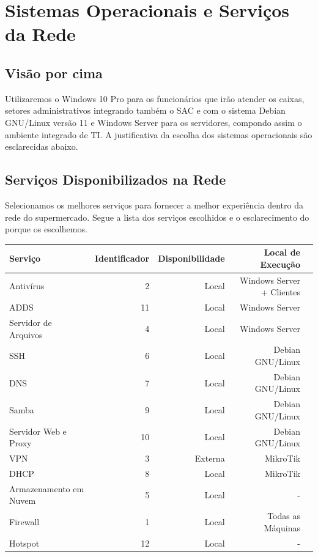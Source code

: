 \documentclass[12pt]{article}
\begin{document}
\section{Sistemas Operacionais e Serviços da Rede}

\subsection{Visão por cima}
Utilizaremos o Windows 10 Pro para os funcionários que irão atender os caixas, setores administrativos integrando também o SAC e com o sistema Debian GNU/Linux versão 11 e Windows Server para os servidores, compondo assim o ambiente integrado de TI. A justificativa da escolha dos sistemas operacionais são esclarecidas abaixo.

\subsection{Serviços Disponibilizados na Rede}
Selecionamos os melhores serviços para fornecer a melhor experiência dentro da rede do supermercado. Segue a lista dos serviços escolhidos e o esclarecimento do porque os escolhemos.

\begin{center}
\begin{tabular}{| l | r | r | r | r |}
\hline
Serviço & Identificador & Disponibilidade & Local de Execução\\
\hline
Antivírus & 2 & Local & Windows Server + Clientes\\
ADDS & 11 & Local & Windows Server\\
Servidor de Arquivos & 4 & Local & Windows Server\\
SSH & 6 & Local & Debian GNU/Linux\\
DNS & 7 & Local & Debian GNU/Linux\\
Samba & 9 & Local & Debian GNU/Linux\\
Servidor Web e Proxy & 10 & Local & Debian GNU/Linux\\
VPN & 3 & Externa & MikroTik\\
DHCP & 8 & Local & MikroTik\\
Armazenamento em Nuvem & 5 & Local & -\\
Firewall & 1 & Local & Todas as Máquinas\\
Hotspot & 12 & Local & -\\
\hline
\end{tabular}
\end{center}
\end{document}
